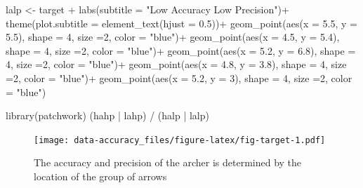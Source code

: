 \documentclass[
  letterpaper,
]{book}
\newenvironment{Shaded}{\begin{snugshade}}{\end{snugshade}}
\newcommand{\AttributeTok}[1]{\textcolor[rgb]{0.40,0.45,0.13}{#1}}
\newcommand{\DecValTok}[1]{\textcolor[rgb]{0.68,0.00,0.00}{#1}}
\newcommand{\FloatTok}[1]{\textcolor[rgb]{0.68,0.00,0.00}{#1}}
\newcommand{\FunctionTok}[1]{\textcolor[rgb]{0.28,0.35,0.67}{#1}}
\newcommand{\NormalTok}[1]{\textcolor[rgb]{0.00,0.23,0.31}{#1}}
\newcommand{\OtherTok}[1]{\textcolor[rgb]{0.00,0.23,0.31}{#1}}
\newcommand{\SpecialCharTok}[1]{\textcolor[rgb]{0.37,0.37,0.37}{#1}}
\newcommand{\StringTok}[1]{\textcolor[rgb]{0.13,0.47,0.30}{#1}}
\begin{document}
\begin{Shaded}
\begin{Highlighting}[]
\NormalTok{lalp }\OtherTok{\textless{}{-}}\NormalTok{ target }\SpecialCharTok{+}
  \FunctionTok{labs}\NormalTok{(}\AttributeTok{subtitle =} \StringTok{"Low Accuracy Low Precision"}\NormalTok{)}\SpecialCharTok{+}
  \FunctionTok{theme}\NormalTok{(}\AttributeTok{plot.subtitle =} \FunctionTok{element\_text}\NormalTok{(}\AttributeTok{hjust =} \FloatTok{0.5}\NormalTok{))}\SpecialCharTok{+}
  \FunctionTok{geom\_point}\NormalTok{(}\FunctionTok{aes}\NormalTok{(}\AttributeTok{x =} \FloatTok{5.5}\NormalTok{, }\AttributeTok{y =} \FloatTok{5.5}\NormalTok{), }\AttributeTok{shape =} \DecValTok{4}\NormalTok{, }\AttributeTok{size =}\DecValTok{2}\NormalTok{, }\AttributeTok{color =} \StringTok{"blue"}\NormalTok{)}\SpecialCharTok{+}
  \FunctionTok{geom\_point}\NormalTok{(}\FunctionTok{aes}\NormalTok{(}\AttributeTok{x =} \FloatTok{4.5}\NormalTok{, }\AttributeTok{y =} \FloatTok{5.4}\NormalTok{), }\AttributeTok{shape =} \DecValTok{4}\NormalTok{, }\AttributeTok{size =}\DecValTok{2}\NormalTok{, }\AttributeTok{color =} \StringTok{"blue"}\NormalTok{)}\SpecialCharTok{+}
  \FunctionTok{geom\_point}\NormalTok{(}\FunctionTok{aes}\NormalTok{(}\AttributeTok{x =} \FloatTok{5.2}\NormalTok{, }\AttributeTok{y =} \FloatTok{6.8}\NormalTok{), }\AttributeTok{shape =} \DecValTok{4}\NormalTok{, }\AttributeTok{size =}\DecValTok{2}\NormalTok{, }\AttributeTok{color =} \StringTok{"blue"}\NormalTok{)}\SpecialCharTok{+}
  \FunctionTok{geom\_point}\NormalTok{(}\FunctionTok{aes}\NormalTok{(}\AttributeTok{x =} \FloatTok{4.8}\NormalTok{, }\AttributeTok{y =} \FloatTok{3.8}\NormalTok{), }\AttributeTok{shape =} \DecValTok{4}\NormalTok{, }\AttributeTok{size =}\DecValTok{2}\NormalTok{, }\AttributeTok{color =} \StringTok{"blue"}\NormalTok{)}\SpecialCharTok{+}
  \FunctionTok{geom\_point}\NormalTok{(}\FunctionTok{aes}\NormalTok{(}\AttributeTok{x =} \FloatTok{5.2}\NormalTok{, }\AttributeTok{y =} \DecValTok{3}\NormalTok{), }\AttributeTok{shape =} \DecValTok{4}\NormalTok{, }\AttributeTok{size =}\DecValTok{2}\NormalTok{, }\AttributeTok{color =} \StringTok{"blue"}\NormalTok{)}


\FunctionTok{library}\NormalTok{(patchwork)}
\NormalTok{(hahp }\SpecialCharTok{|}\NormalTok{ lahp) }\SpecialCharTok{/}
\NormalTok{(halp }\SpecialCharTok{|}\NormalTok{ lalp)}
\end{Highlighting}
\end{Shaded}

\begin{figure}

\texttt{[image: data-accuracy\_files/figure-latex/fig-target-1.pdf]} \hfill{}

\caption{\label{fig-target}The accuracy and precision of the archer is
determined by the location of the group of arrows}

\end{figure}
\end{document}
